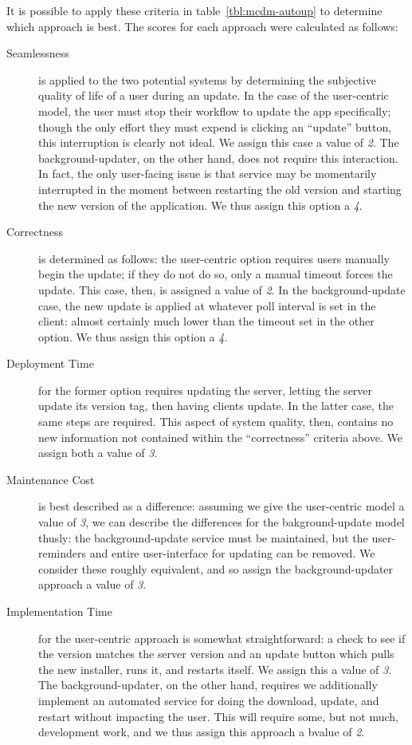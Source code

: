 \documentclass[12pt]{article}
\begin{document}
It is possible to apply these criteria in table~\ref{tbl:mcdm-autoup} to determine which approach is best. The scores for each approach were calculated as follows:
\begin{description}
\item[Seamlessness] is applied to the two potential systems by determining the subjective quality of life of a user during an update. In the case of the user-centric model, the user must stop their workflow to update the app specifically; though the only effort they must expend is clicking an ``update'' button, this interruption is clearly not ideal. We assign this case a value of {\it 2}. The background-updater, on the other hand, does not require this interaction. In fact, the only user-facing issue is that service may be momentarily interrupted in the moment between restarting the old version and starting the new version of the application. We thus assign this option a {\it 4}.
\item[Correctness] is determined as follows: the user-centric option requires users manually begin the update; if they do not do so, only a manual timeout forces the update. This case, then, is assigned a value of {\it 2}. In the background-update case, the new update is applied at whatever poll interval is set in the client: almost certainly much lower than the timeout set in the other option. We thus assign this option a {\it 4}.
\item[Deployment Time] for the former option requires updating the server, letting the server update its version tag, then having clients update. In the latter case, the same steps are required. This aspect of system quality, then, contains no new information not contained within the ``correctness'' criteria above. We assign both a value of {\it 3}.
\item[Maintenance Cost] is best described as a difference: assuming we give the user-centric model a value of {\it 3}, we can describe the differences for the bakground-update model thusly: the background-update service must be maintained, but the user-reminders and entire user-interface for updating can be removed. We consider these roughly equivalent, and so assign the background-updater approach a value of {\it 3}.
\item[Implementation Time] for the user-centric approach is somewhat straightforward: a check to see if the version matches the server version and an update button which pulls the new installer, runs it, and restarts itself. We assign this a value of {\it 3}. The background-updater, on the other hand, requires we additionally implement an automated service for doing the download, update, and restart without impacting the user. This will require some, but not much, development work, and we thus assign this approach a bvalue of {\it 2}.
\end{description}
\end{document}
